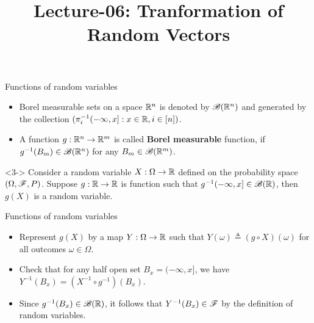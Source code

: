 \documentclass[12pt,aspectratio=169]{beamer}
\title{Lecture-06: Tranformation of Random Vectors}
\date{}
\begin{document}
\pagestyle{empty}
\maketitle
\begin{frame}{Functions of random variables}
\begin{Definition}
\begin{itemize}
\item<1-> Borel measurable sets on a space $\mathbb{R}^n$ is denoted by $\mathscr{B}(\mathbb{R}^n)$ and generated by the collection $(\pi_i^{-1}(-\infty,x]: x \in \mathbb{R}, i \in [n])$. 
\item<2-> A function $g: \mathbb{R}^n\to \mathbb{R}^m$ is called \textbf{Borel measurable} function, 
if $g^{-1}(B_m) \in \mathscr{B}(\mathbb{R}^n)$ for any $B_m \in \mathscr{B}(\mathbb{R}^m)$. 
\end{itemize}
\end{Definition}
\begin{prop}<3->
Consider a random variable $X: \Omega \to \mathbb{R}$ defined on the probability space $(\Omega, \mathscr{F}, P)$. 
Suppose $g: \mathbb{R} \to \mathbb{R}$ is function such that $g^{-1}(-\infty, x] \in \mathscr{B}(\mathbb{R})$, 
then $g(X)$ is a random variable. 
\end{prop}
\end{frame}

\begin{frame}{Functions of random variables}
\begin{Proof}
\begin{itemize}
    \item<1-> Represent $g(X)$ by a map $Y: \Omega \to \mathbb{R}$ such that $Y(\omega) \triangleq (g \circ X)(\omega)$ for all outcomes $\omega \in \Omega$. 
    \item<2-> Check that for any half open set $B_x = (-\infty,x]$, we have $Y^{-1}(B_x) = (X^{-1}\circ g^{-1})(B_x)$. 
    \item<3-> Since $g^{-1}(B_x) \in \mathscr{B}(\mathbb{R})$, it follows that $Y^{-1}(B_x) \in \mathscr{F}$ by the definition of random variables.
\end{itemize}
\end{Proof}
\end{frame}
\end{document}
